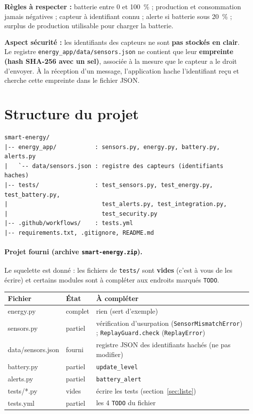 \documentclass[11pt,a4paper]{article}
\begin{document}
\textbf{Règles à respecter :}
batterie entre 0 et 100~\% ; production et consommation jamais négatives ;
capteur à identifiant connu ; alerte si batterie sous 20~\% ; surplus de production
utilisable pour charger la batterie.

\textbf{Aspect sécurité :} les identifiants des capteurs ne sont \textbf{pas stockés en clair}.
Le registre \texttt{energy\_app/data/sensors.json} ne contient que leur \textbf{empreinte
(hash SHA-256 avec un sel)}, associée à la mesure que le capteur a le droit d'envoyer.
À la réception d'un message, l'application hache l'identifiant reçu et cherche
cette empreinte dans le fichier JSON.

\section{Structure du projet}

\begin{lstlisting}[style=project]
smart-energy/
|-- energy_app/           : sensors.py, energy.py, battery.py, alerts.py
|   `-- data/sensors.json : registre des capteurs (identifiants haches)
|-- tests/                : test_sensors.py, test_energy.py, test_battery.py,
|                           test_alerts.py, test_integration.py,
|                           test_security.py
|-- .github/workflows/    : tests.yml
|-- requirements.txt, .gitignore, README.md
\end{lstlisting}

\paragraph{Projet fourni (archive \texttt{smart-energy.zip}).}
Le squelette est donné : les fichiers de \texttt{tests/} sont \textbf{vides} (c'est à vous de
les écrire) et certains modules sont à compléter aux endroits marqués \texttt{TODO}.

\begin{center}
\footnotesize
\renewcommand{\arraystretch}{1.2}
\begin{tabularx}{\textwidth}{|>{\ttfamily}p{3.4cm}|p{1.8cm}|X|}
\hline
\rowcolor{blue!12} \textrm{Fichier} & \textrm{État} & \textrm{À compléter}\\
\hline
energy.py & complet & rien (sert d'exemple)\\
\hline
sensors.py & partiel & vérification d'usurpation (\texttt{SensorMismatchError}) ; \texttt{ReplayGuard.check} (\texttt{ReplayError})\\
\hline
data/sensors.json & fourni & registre JSON des identifiants hachés (ne pas modifier)\\
\hline
battery.py & partiel & \texttt{update\_level}\\
\hline
alerts.py & partiel & \texttt{battery\_alert}\\
\hline
tests/*.py & vides & écrire les tests (section~\ref{sec:liste})\\
\hline
tests.yml & partiel & les 4 \texttt{TODO} du fichier\\
\hline
\end{tabularx}
\end{center}
\end{document}
